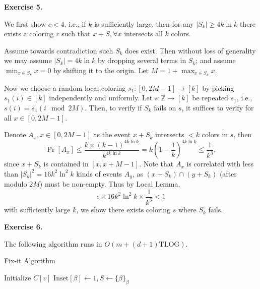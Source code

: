 \documentclass[a4paper]{article}
\newenvironment{exercise}[1]{
	\par
	\noindent\textbf{Exercise #1.}\quad
}{
	\par
	\bigskip
}
\newcommand{\pbra}[1]{\left( #1 \right)}
\newcommand{\sbra}[1]{\left[ #1 \right]}
\newcommand{\Zbb}{\mathbb{Z}}
\begin{document}
\begin{exercise}{5}
    We first show $c<4$, i.e., if $k$ is sufficiently large, then for any $|S_k|\geq4k\ln k$ there exists a coloring
    $r$ such that $x+S,\forall x$ intersects all $k$ colors.

    Assume towards contradiction such $S_k$ does exist. Then without loss of generality we may assume $|S_k|=4k\ln k$ by dropping
    several terms in $S_k$; and assume $\min_{x\in S_k}x=0$ by shifting it to the origin. Let $M=1+\max_{x\in S_k}x$.

    Now we choose a random local coloring $s_1:[0,2M-1]\to[k]$ by picking $s_1(i)\in[k]$ independently and uniformly.
    Let $s:\Zbb\to[k]$ be repeated $s_1$, i.e., $s(i)=s_1(i\mod 2M)$.
    Then, to verify if $S_k$ fails on $s$, it suffices to verify for all $x\in[0,2M-1]$.

    Denote $A_x,x\in[0,2M-1]$ as the event $x+S_k$ intersects $<k$ colors in $s$, then
    $$
    \Pr\sbra{A_x}\leq\frac{k\times(k-1)^{4k\ln k}}{k^{4k\ln k}}=k\pbra{1-\frac1k}^{4k\ln k}\leq\frac1{k^3},
    $$
    since $x+S_k$ is contained in $[x,x+M-1]$.
    Note that $A_x$ is correlated with less than $|S_k|^2=16k^2\ln^2k$ kinds of events $A_y$, as $(x+S_k)\cap(y+S_k)$ 
    (after modulo $2M$) must be non-empty. 
    Thus by Local Lemma, 
    $$
    e\times16k^2\ln^2k\times\frac1{k^3}<1
    $$
    with sufficiently large $k$, we show there exists coloring $s$ where $S_k$ fails.

\end{exercise}

\begin{exercise}{6}
    The following algorithm runs in $O(m+(d+1)\mathrm{TLOG})$.

    \begin{algorithm}[H]
        \caption{Fix-it Algorithm}
        \DontPrintSemicolon
        Initialize $C[v]$\;
        $\mathrm{Inset}[\beta]\gets1,S\gets\{\beta\}_\beta$\;
    \end{algorithm}
\end{exercise}
\end{document}
